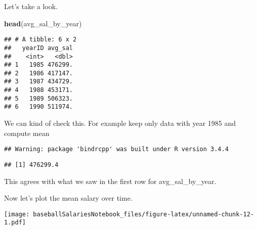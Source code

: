 \documentclass[]{article}
\newenvironment{Shaded}{\begin{snugshade}}{\end{snugshade}}
\newcommand{\KeywordTok}[1]{\textcolor[rgb]{0.13,0.29,0.53}{\textbf{#1}}}
\newcommand{\DataTypeTok}[1]{\textcolor[rgb]{0.13,0.29,0.53}{#1}}
\newcommand{\DecValTok}[1]{\textcolor[rgb]{0.00,0.00,0.81}{#1}}
\newcommand{\StringTok}[1]{\textcolor[rgb]{0.31,0.60,0.02}{#1}}
\newcommand{\OperatorTok}[1]{\textcolor[rgb]{0.81,0.36,0.00}{\textbf{#1}}}
\newcommand{\NormalTok}[1]{#1}
\begin{document}
Let's take a look.

\begin{Shaded}
\begin{Highlighting}[]
\KeywordTok{head}\NormalTok{(avg_sal_by_year)}
\end{Highlighting}
\end{Shaded}

\begin{verbatim}
## # A tibble: 6 x 2
##   yearID avg_sal
##    <int>   <dbl>
## 1   1985 476299.
## 2   1986 417147.
## 3   1987 434729.
## 4   1988 453171.
## 5   1989 506323.
## 6   1990 511974.
\end{verbatim}

We can kind of check this. For example keep only data with year 1985 and
compute mean

\begin{Shaded}
\end{Shaded}

\begin{verbatim}
## Warning: package 'bindrcpp' was built under R version 3.4.4
\end{verbatim}

\begin{verbatim}
## [1] 476299.4
\end{verbatim}

This agrees with what we saw in the first row for avg\_sal\_by\_year.

Now let's plot the mean salary over time.

\begin{Shaded}
\end{Shaded}

\texttt{[image: baseballSalariesNotebook\_files/figure-latex/unnamed-chunk-12-1.pdf]}
\end{document}
